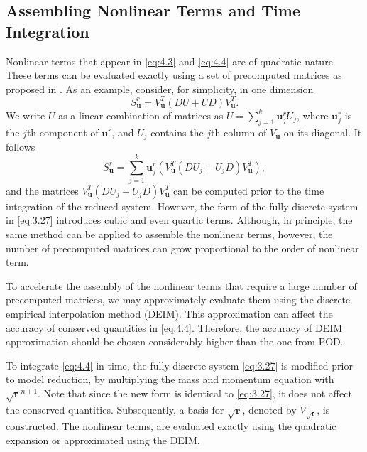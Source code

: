 \subsection{Assembling Nonlinear Terms and Time Integration}
Nonlinear terms that appear in \eqref{eq:4.3} and \eqref{eq:4.4} are of quadratic nature. These terms can be evaluated exactly using a set of precomputed matrices as proposed in \cite{Benner2018}. As an example, consider, for simplicity, in one dimension
\begin{equation}
	S_{\mathbf u}^r = V^T_{\mathbf u} ( DU + UD ) V^T_{\mathbf u}.
\end{equation}
We write $U$ as a linear combination of matrices as $U = \sum_{j=1}^k \mathbf u ^r_j U_j$, where $\mathbf u ^r_j$ is the $j$th component of $\mathbf u ^r$, and $U_j$ contains the $j$th column of $V_{\mathbf u}$ on its diagonal. It follows
\begin{equation}
	S_{\mathbf u}^r = \sum_{j=1}^k \mathbf u ^r_j \left( V^T_{\mathbf u} ( DU_j + U_jD ) V^T_{\mathbf u} \right),
\end{equation}
and the matrices $V^T_{\mathbf u} ( DU_j + U_jD ) V^T_{\mathbf u}$ can be computed prior to the time integration of the reduced system. However, the form of the fully discrete system in \eqref{eq:3.27} introduces cubic and even quartic terms. Although, in principle, the same method can be applied to assemble the nonlinear terms, however, the number of precomputed matrices can grow proportional to the order of nonlinear term. 

To accelerate the assembly of the nonlinear terms that require a large number of precomputed matrices, we may approximately evaluate them using the discrete empirical interpolation method (DEIM). This approximation can affect the accuracy of conserved quantities in \eqref{eq:4.4}. Therefore, the accuracy of DEIM approximation should be chosen considerably higher than the one from POD.

To integrate \eqref{eq:4.4} in time, the fully discrete system \eqref{eq:3.27} is modified prior to model reduction, by multiplying the mass and momentum equation with $\sqrt{\mathbf r}^{n+1}$. Note that since the new form is identical to \eqref{eq:3.27}, it does not affect the conserved quantities. Subsequently, a basis for $\sqrt{\mathbf r}$, denoted by $V_{\sqrt{\mathbf r}}$, is constructed. The nonlinear terms, are evaluated exactly using the quadratic expansion or approximated using the DEIM.
